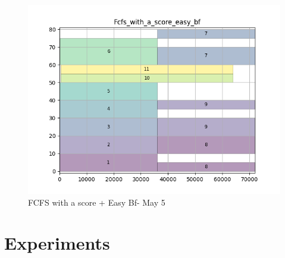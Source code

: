 \documentclass[a4paper]{article}
\begin{document}
\begin{figure}[H]
\begin{minipage}[b]{0.5\linewidth}
    \centering
    \includegraphics[width=1.11\linewidth]{MBSS/plot/Gantt_charts/test/Fcfs_with_a_score_easy_bf.png} 
    \caption{FCFS with a score + Easy Bf- May 5} 
    \vspace{4ex}
  \end{minipage}%
\end{figure}

\section{Experiments}
\end{document}
